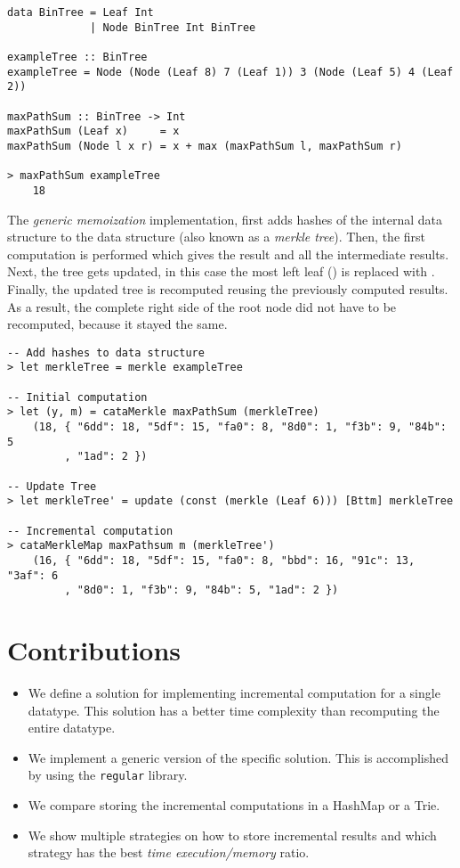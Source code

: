 \begin{verbatim}
data BinTree = Leaf Int
             | Node BinTree Int BinTree 
             
exampleTree :: BinTree    
exampleTree = Node (Node (Leaf 8) 7 (Leaf 1)) 3 (Node (Leaf 5) 4 (Leaf 2))

maxPathSum :: BinTree -> Int
maxPathSum (Leaf x)     = x
maxPathSum (Node l x r) = x + max (maxPathSum l, maxPathSum r)

> maxPathSum exampleTree
    18
\end{verbatim}

The \textit{generic memoization} implementation, first adds hashes of the internal data structure to the data structure (also known as a \textit{merkle tree}). Then, the first computation is performed which gives the result and all the intermediate results. Next, the tree gets updated, in this case the most left leaf () is replaced with . Finally, the updated tree is recomputed reusing the previously computed results. As a result, the complete right side of the root node did not have to be recomputed, because it stayed the same.

\begin{verbatim}
-- Add hashes to data structure
> let merkleTree = merkle exampleTree

-- Initial computation
> let (y, m) = cataMerkle maxPathSum (merkleTree)
    (18, { "6dd": 18, "5df": 15, "fa0": 8, "8d0": 1, "f3b": 9, "84b": 5
         , "1ad": 2 })

-- Update Tree
> let merkleTree' = update (const (merkle (Leaf 6))) [Bttm] merkleTree

-- Incremental computation
> cataMerkleMap maxPathsum m (merkleTree')
    (16, { "6dd": 18, "5df": 15, "fa0": 8, "bbd": 16, "91c": 13, "3af": 6
         , "8d0": 1, "f3b": 9, "84b": 5, "1ad": 2 })
\end{verbatim}

\section{Contributions}
\begin{itemize}
    \item We define a solution for implementing incremental computation for a single datatype. This solution has a better time complexity than recomputing the entire datatype.
    \item We implement a generic version of the specific solution. This is accomplished by using the \texttt{regular} library.
    \item We compare storing the incremental computations in a HashMap or a Trie.
    \item We show multiple strategies on how to store incremental results and which strategy has the best \textit{time execution/memory} ratio. %
\end{itemize}